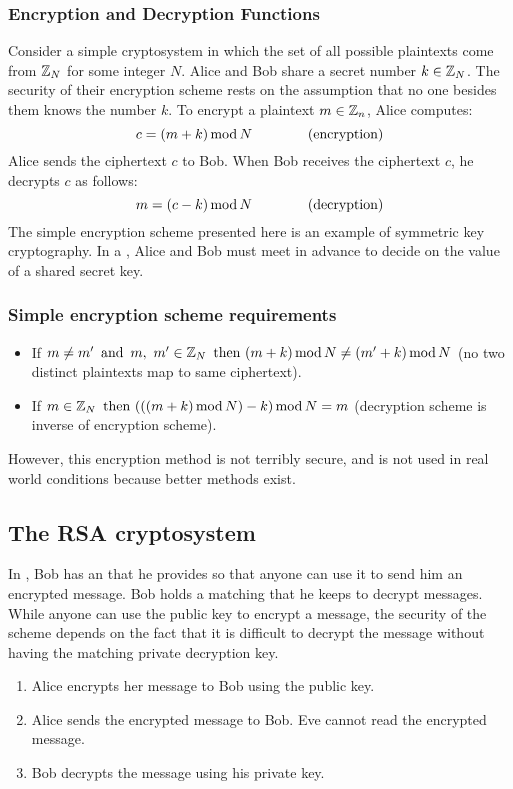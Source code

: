 \subsubsection*{Encryption and Decryption Functions}
Consider a simple cryptosystem in which the set of all possible plaintexts come from $\mathbb{Z}_N$ for some integer $N$. Alice and Bob share a secret number $k \in \mathbb{Z}_N$. The security of their encryption scheme rests on the assumption that no one besides them knows the number $k$. To encrypt a plaintext $m \in \mathbb{Z}_n$, Alice computes:
\[
    c = (m + k) \operatorname{\text{mod}} N \qquad \qquad \text{(encryption)}
\]
Alice sends the ciphertext $c$ to Bob. When Bob receives the ciphertext $c$, he decrypts $c$ as follows:
\[
    m = (c - k) \operatorname{\text{mod}} N \qquad \qquad \text{(decryption)}
\]
The simple encryption scheme presented here is an example of symmetric key cryptography. In a , Alice and Bob must meet in advance to decide on the value of a shared secret key.

\subsubsection*{Simple encryption scheme requirements}
\begin{itemize}
    \item If $m \neq m' \operatorname{~\text{and}~} m,~m' \in \mathbb{Z}_N \operatorname{~\text{then}~} (m+k) \operatorname{\text{mod}} N \neq (m'+k) \operatorname{\text{mod}} N$ (no two distinct plaintexts map to same ciphertext).
    \item If $m \in \mathbb{Z}_N \operatorname{~\text{then}~} (((m+k) \operatorname{\text{mod}} N)-k) \operatorname{\text{mod}} N = m$ (decryption scheme is inverse of encryption scheme).
\end{itemize}
However, this encryption method is not terribly secure, and is not used in real world conditions because better methods exist.

\subsection{The RSA cryptosystem}
In , Bob has an  that he provides  so that anyone can use it to send him an encrypted message. Bob holds a matching  that he keeps  to decrypt messages. While anyone can use the public key to encrypt a message, the security of the scheme depends on the fact that it is difficult to decrypt the message without having the matching private decryption key.
\begin{enumerate}
    \item Alice encrypts her message to Bob using the public key.
    \item Alice sends the encrypted message to Bob. Eve cannot read the encrypted message.
    \item Bob decrypts the message using his private key.
\end{enumerate}

